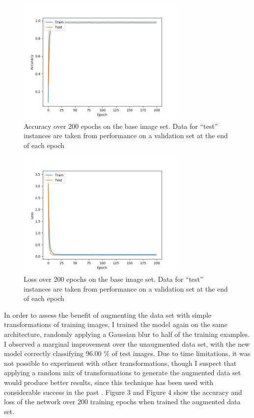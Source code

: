 \documentclass[letterpaper,twocolumn,10pt]{article}
\begin{document}
\begin{figure}
\includegraphics[width=3.25in]{accuracy}
\caption{Accuracy over 200 epochs on the base image set. Data for ``test'' instances are taken from performance on a validation set at the end of each epoch}
\end{figure}

\begin{figure}
\includegraphics[width=3.25in]{loss}
\caption{Loss over 200 epochs on the base image set. Data for ``test'' instances are taken from performance on a validation set at the end of each epoch}
\end{figure}

In order to assess the benefit of augmenting the data set with simple transformations of training images, I trained the model again on the same architecture, randomly applying a Gaussian blur to half of the training examples. I observed a marginal improvement over the unaugmented data set, with the new model correctly classifying 96.00 \% of test images. Due to time limitations, it was not possible to experiment with other transformations, though I suspect that applying a random mix of transformations to generate the augmented data set would produce better results, since this technique has been used with considerable success in the past \cite{ciresan_committee_2011}. Figure 3 and Figure 4 show the accuracy and loss of the network over 200 training epochs when trained the augmented data set.
\end{document}
